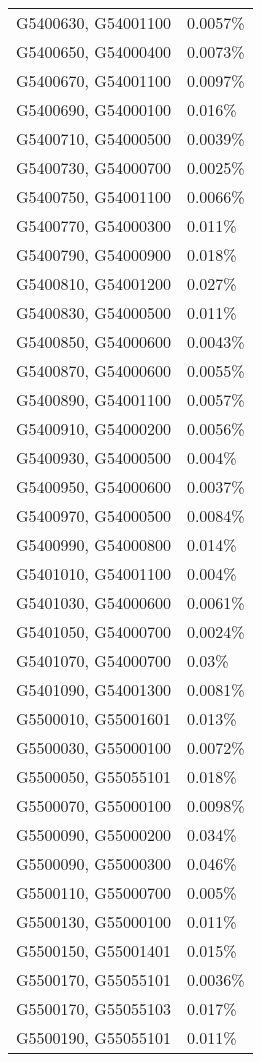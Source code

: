 \begin{longtable}[]{@{}ll@{}}
G5400630, G54001100 & 0.0057\% \\
G5400650, G54000400 & 0.0073\% \\
G5400670, G54001100 & 0.0097\% \\
G5400690, G54000100 & 0.016\% \\
G5400710, G54000500 & 0.0039\% \\
G5400730, G54000700 & 0.0025\% \\
G5400750, G54001100 & 0.0066\% \\
G5400770, G54000300 & 0.011\% \\
G5400790, G54000900 & 0.018\% \\
G5400810, G54001200 & 0.027\% \\
G5400830, G54000500 & 0.011\% \\
G5400850, G54000600 & 0.0043\% \\
G5400870, G54000600 & 0.0055\% \\
G5400890, G54001100 & 0.0057\% \\
G5400910, G54000200 & 0.0056\% \\
G5400930, G54000500 & 0.004\% \\
G5400950, G54000600 & 0.0037\% \\
G5400970, G54000500 & 0.0084\% \\
G5400990, G54000800 & 0.014\% \\
G5401010, G54001100 & 0.004\% \\
G5401030, G54000600 & 0.0061\% \\
G5401050, G54000700 & 0.0024\% \\
G5401070, G54000700 & 0.03\% \\
G5401090, G54001300 & 0.0081\% \\
G5500010, G55001601 & 0.013\% \\
G5500030, G55000100 & 0.0072\% \\
G5500050, G55055101 & 0.018\% \\
G5500070, G55000100 & 0.0098\% \\
G5500090, G55000200 & 0.034\% \\
G5500090, G55000300 & 0.046\% \\
G5500110, G55000700 & 0.005\% \\
G5500130, G55000100 & 0.011\% \\
G5500150, G55001401 & 0.015\% \\
G5500170, G55055101 & 0.0036\% \\
G5500170, G55055103 & 0.017\% \\
G5500190, G55055101 & 0.011\% \\

\end{longtable}
